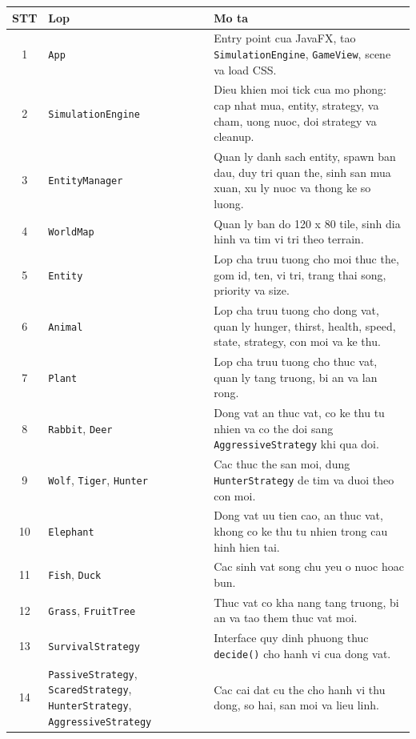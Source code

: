 \documentclass[12pt,a4paper]{article}
\begin{document}
\begin{longtable}{|c|p{4cm}|p{8cm}|}
    \hline
    \textbf{STT} & \textbf{Lop} & \textbf{Mo ta} \\
    \hline
    1 & \texttt{App} & Entry point cua JavaFX, tao \texttt{SimulationEngine}, \texttt{GameView}, scene va load CSS. \\
    \hline
    2 & \texttt{SimulationEngine} & Dieu khien moi tick cua mo phong: cap nhat mua, entity, strategy, va cham, uong nuoc, doi strategy va cleanup. \\
    \hline
    3 & \texttt{EntityManager} & Quan ly danh sach entity, spawn ban dau, duy tri quan the, sinh san mua xuan, xu ly nuoc va thong ke so luong. \\
    \hline
    4 & \texttt{WorldMap} & Quan ly ban do 120 x 80 tile, sinh dia hinh va tim vi tri theo terrain. \\
    \hline
    5 & \texttt{Entity} & Lop cha truu tuong cho moi thuc the, gom id, ten, vi tri, trang thai song, priority va size. \\
    \hline
    6 & \texttt{Animal} & Lop cha truu tuong cho dong vat, quan ly hunger, thirst, health, speed, state, strategy, con moi va ke thu. \\
    \hline
    7 & \texttt{Plant} & Lop cha truu tuong cho thuc vat, quan ly tang truong, bi an va lan rong. \\
    \hline
    8 & \texttt{Rabbit}, \texttt{Deer} & Dong vat an thuc vat, co ke thu tu nhien va co the doi sang \texttt{AggressiveStrategy} khi qua doi. \\
    \hline
    9 & \texttt{Wolf}, \texttt{Tiger}, \texttt{Hunter} & Cac thuc the san moi, dung \texttt{HunterStrategy} de tim va duoi theo con moi. \\
    \hline
    10 & \texttt{Elephant} & Dong vat uu tien cao, an thuc vat, khong co ke thu tu nhien trong cau hinh hien tai. \\
    \hline
    11 & \texttt{Fish}, \texttt{Duck} & Cac sinh vat song chu yeu o nuoc hoac bun. \\
    \hline
    12 & \texttt{Grass}, \texttt{FruitTree} & Thuc vat co kha nang tang truong, bi an va tao them thuc vat moi. \\
    \hline
    13 & \texttt{SurvivalStrategy} & Interface quy dinh phuong thuc \texttt{decide()} cho hanh vi cua dong vat. \\
    \hline
    14 & \texttt{PassiveStrategy}, \texttt{ScaredStrategy}, \texttt{HunterStrategy}, \texttt{AggressiveStrategy} & Cac cai dat cu the cho hanh vi thu dong, so hai, san moi va lieu linh. \\

\end{longtable}
\end{document}
